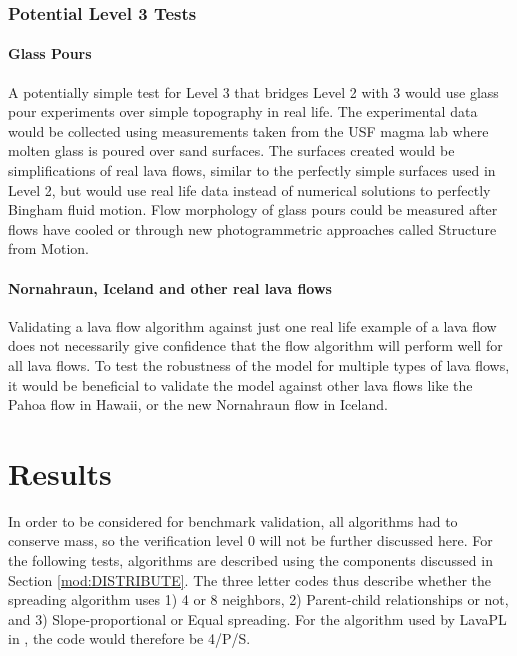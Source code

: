 \documentclass[12pt,letter]{article}
\begin{document}
		\subsubsection{Potential Level 3 Tests}
		\paragraph{Glass Pours}
			A potentially simple test for Level 3 that bridges Level 2 with 3 would use glass pour experiments over simple topography in real life. The experimental data would be collected using measurements taken from the USF magma lab where molten glass is poured over sand surfaces. The surfaces created would be simplifications of real lava flows, similar to the perfectly simple surfaces used in Level 2, but would use real life data instead of numerical solutions to perfectly Bingham fluid motion. Flow morphology of glass pours could be measured after flows have cooled or through new photogrammetric approaches called Structure from Motion.
			
		\paragraph{Nornahraun, Iceland and other real lava flows}
			Validating a lava flow algorithm against just one real life example of a lava flow does not necessarily give confidence that the flow algorithm will perform well for all lava flows. To test the robustness of the model for multiple types of lava flows, it would be beneficial to validate the model against other lava flows like the Pahoa flow in Hawaii, or the new Nornahraun flow in Iceland.
			
		


\section{Results}
	
	In order to be considered for benchmark validation, all algorithms had to conserve mass, so the verification level 0 will not be further discussed here. For the following tests, algorithms are described using the components discussed in Section \ref{mod:DISTRIBUTE}. The three letter codes thus describe whether the spreading algorithm uses 1) 4 or 8 neighbors, 2) Parent-child relationships or not, and 3) Slope-proportional or Equal spreading. For the algorithm used by LavaPL in \citet{connor2012}, the code would therefore be 4/P/S.
\end{document}
